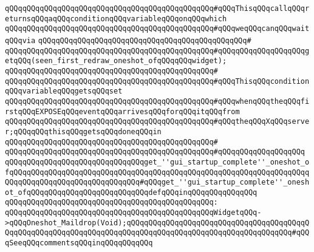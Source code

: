 \verb|qQQqqQQqqQQqqQQqqQQqqQQqqQQqqQQqqQQqqQQqqQQqqQQq#qQQqThisqQQqcallqQQqreturnsqQQqaqQQqconditionqQQqvariableqQQqonqQQqwhich|\newline
\verb|qQQqqQQqqQQqqQQqqQQqqQQqqQQqqQQqqQQqqQQqqQQqqQQq#qQQqweqQQqcanqQQqwaitqQQqvia|\newline
\verb|qQQqqQQqqQQqqQQqqQQqqQQqqQQqqQQqqQQqqQQqqQQqqQQq#|\newline
\verb|qQQqqQQqqQQqqQQqqQQqqQQqqQQqqQQqqQQqqQQqqQQqqQQq#qQQqqQQqqQQqqQQqqQQqgetqQQq(seen_first_redraw_oneshot_ofqQQqqQQqwidget);|\newline
\verb|qQQqqQQqqQQqqQQqqQQqqQQqqQQqqQQqqQQqqQQqqQQqqQQq#|\newline
\verb|qQQqqQQqqQQqqQQqqQQqqQQqqQQqqQQqqQQqqQQqqQQqqQQq#qQQqThisqQQqconditionqQQqvariableqQQqgetsqQQqset|\newline
\verb|qQQqqQQqqQQqqQQqqQQqqQQqqQQqqQQqqQQqqQQqqQQqqQQq#qQQqwhenqQQqtheqQQqfirstqQQqEXPOSEqQQqeventqQQqarrivesqQQqforqQQqitqQQqfrom|\newline
\verb|qQQqqQQqqQQqqQQqqQQqqQQqqQQqqQQqqQQqqQQqqQQqqQQq#qQQqtheqQQqXqQQqserver;qQQqqQQqthisqQQqgetsqQQqdoneqQQqin|\newline
\verb|qQQqqQQqqQQqqQQqqQQqqQQqqQQqqQQqqQQqqQQqqQQqqQQq#|\newline
\verb|qQQqqQQqqQQqqQQqqQQqqQQqqQQqqQQqqQQqqQQqqQQqqQQq#qQQqqQQqqQQqqQQqqQQq|\newline
\newline
\verb|qQQqqQQqqQQqqQQqqQQqqQQqqQQqqQQqget_''gui_startup_complete''_oneshot_ofqQQqqQQqqQQqqQQqqQQqqQQqqQQqqQQqqQQqqQQqqQQqqQQqqQQqqQQqqQQqqQQqqQQqqQQqqQQqqQQqqQQqqQQqqQQqqQQqqQQq#qQQqget_''gui_startup_complete''_oneshot_ofqQQqqQQqqQQqqQQqqQQqqQQqqQQqdefqQQqinqQQqqQQqqQQqqQQq|\newline
\verb|qQQqqQQqqQQqqQQqqQQqqQQqqQQqqQQqqQQqqQQqqQQqqQQq:|\newline
\verb|qQQqqQQqqQQqqQQqqQQqqQQqqQQqqQQqqQQqqQQqqQQqqQQqWidgetqQQq->qQQqOneshot_Maildrop(Void);qQQqqQQqqQQqqQQqqQQqqQQqqQQqqQQqqQQqqQQqqQQqqQQqqQQqqQQqqQQqqQQqqQQqqQQqqQQqqQQqqQQqqQQqqQQqqQQqqQQqqQQqqQQq#qQQqSeeqQQqcommentsqQQqinqQQqqQQqqQQq|\newline
